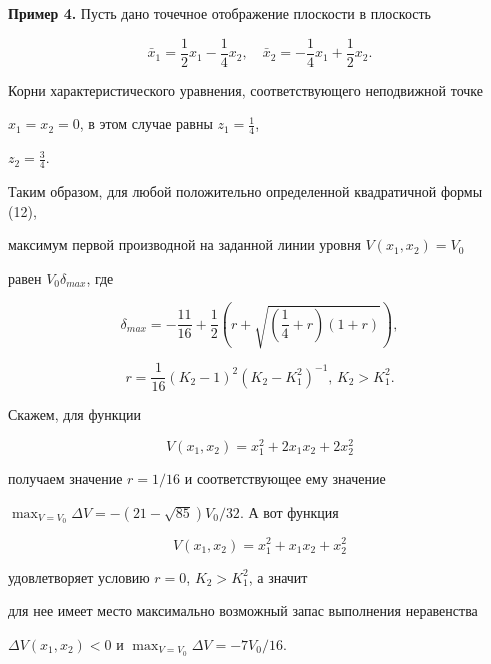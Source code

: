 {\bf Пример 4.} Пусть дано точечное отображение плоскости в плоскость


$$


\bar x_{1}=\frac {1}{2}x_{1}-\frac {1}{4}x_{2}, \quad


\bar x_{2}=-\frac {1}{4}x_{1}+\frac {1}{2}x_{2}.


$$


Корни характеристического уравнения, соответствующего неподвижной точке


$x_{1}=x_{2}=0$, в этом случае равны $z_{1}=\frac {1}{4}$, 


$z_{2}=\frac {3}{4}$.


Таким образом, для любой положительно определенной квадратичной формы (12),


максимум первой производной на заданной линии уровня $V(x_{1},x_{2})=V_{0}$


равен $V_{0}\delta_{max}$, где


$$


\delta_{max}=-\frac {11}{16}+\frac {1}{2}\left (r+


\sqrt {\left (\frac {1}{4}+r\right )\left (1+r\right )}\right ),


$$


$$


r=\frac {1}{16}(K_{2}-1)^{2}(K_{2}-K_{1}^{2})^{-1},\, K_{2}>K_{1}^{2}.


$$


Скажем, для функции


$$


V(x_{1},x_{2})=x_{1}^{2}+2x_{1}x_{2}+2x_{2}^{2}


$$


получаем значение $r=1/16$ и соответствующее ему значение


$\max_{V=V_{0}}\Delta V=-(21-\sqrt {85})V_{0}/32$. А вот функция


$$


V(x_{1},x_{2})=x_{1}^{2}+x_{1}x_{2}+x_{2}^{2}


$$


удовлетворяет условию $r=0$, $K_{2}>K_{1}^{2}$, а значит


для нее имеет место максимально возможный запас выполнения неравенства 


$\Delta V(x_{1},x_{2})<0$ и $\max_{V=V_{0}}\Delta V=-7V_{0}/16$.





%

















